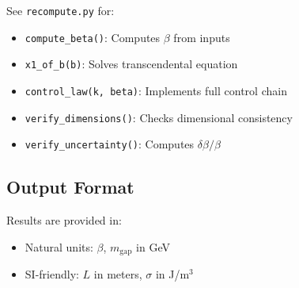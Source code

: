 \documentclass[11pt,a4paper]{article}
\newcommand{\mgap}{m_{\mathrm{gap}}}
\theoremstyle{definition}
\theoremstyle{plain}
\theoremstyle{remark}
\begin{document}
See \texttt{recompute.py} for:
\begin{itemize}
\item \texttt{compute\_beta()}: Computes $\beta$ from inputs
\item \texttt{x1\_of\_b(b)}: Solves transcendental equation
\item \texttt{control\_law(k, beta)}: Implements full control chain
\item \texttt{verify\_dimensions()}: Checks dimensional consistency
\item \texttt{verify\_uncertainty()}: Computes $\delta\beta/\beta$
\end{itemize}

\subsection{Output Format}

Results are provided in:
\begin{itemize}
\item Natural units: $\beta$, $\mgap$ in GeV
\item SI-friendly: $L$ in meters, $\sigma$ in J/m$^3$
\end{itemize}

\end{document}
